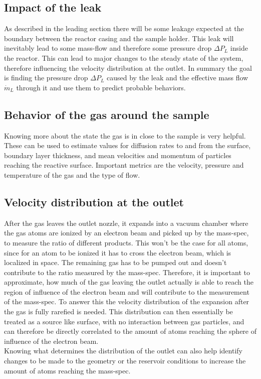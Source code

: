 \subsection{Impact of the leak}

As described in the leading section there will be some leakage expected at the boundary between the reactor casing and the sample holder.
This leak will inevitably lead to some mass-flow and therefore some pressure drop $\Delta P_L$ inside the reactor.
This can lead to major changes to the steady state of the system, therefore influencing the velocity distribution at the outlet.
In summary the goal is finding the pressure drop $\Delta P_L$ caused by the leak and the effective mass flow $\dot{m}_L$ through it and use them to predict probable behaviors.

\subsection{Behavior of the gas around the sample}

Knowing more about the state the gas is in close to the sample is very helpful.
These can be used to estimate values for diffusion rates to and from the surface, boundary layer thickness, and mean velocities and momentum of particles reaching the reactive surface. 
Important metrics are the velocity, pressure and temperature of the gas and the type of flow.

\subsection{Velocity distribution at the outlet}

After the gas leaves the outlet nozzle, it expands into a vacuum chamber where the gas atoms are ionized by an electron beam and picked up by the mass-spec, to measure the ratio of different products.
This won't be the case for all atoms, since for an atom to be ionized it has to cross the electron beam, which is localized in space.
The remaining gas has to be pumped out and doesn't contribute to the ratio measured by the mass-spec.
Therefore, it is important to approximate, how much of the gas leaving the outlet actually is able to reach the region of influence of the electron beam and will contribute to the measurement of the mass-spec.
To answer this the velocity distribution of the expansion after the gas is fully rarefied is needed.
This distribution can then essentially be treated as a source like surface, with no interaction between gas particles, and can therefore be directly correlated to the amount of atoms reaching the sphere of influence of the electron beam.\\
Knowing what determines the distribution of the outlet can also help identify changes to be made to the geometry or the reservoir conditions to increase the amount of atoms reaching the mass-spec.

\newpage
